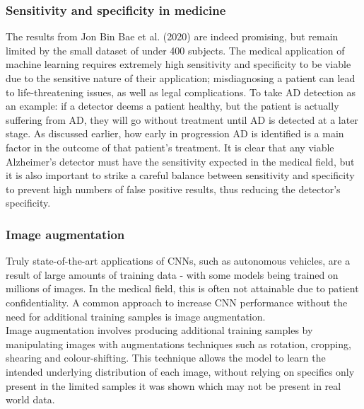 \documentclass[
    author={Kai Hulme},
    supervisor={Dr Jon Bird},
    degree={BSc},
    title={Generative Adversarial Networks as an Augmentation Technique},
    subtitle={for Alzheimer's Disease Detection in MRI Volumes},
    type={Research},
    year={2021} 
]{dissertation}
\begin{document}
\subsubsection{Sensitivity and specificity in medicine}
\label{sens_spec_in_medicine}

The results from Jon Bin Bae et al. (2020) are indeed promising, but remain limited by the small dataset of under 400 subjects. The medical application of machine learning requires extremely high sensitivity and specificity to be viable due to the sensitive nature of their application; misdiagnosing a patient can lead to life-threatening issues, as well as legal complications. To take AD detection as an example: if a detector deems a patient healthy, but the patient is actually suffering from AD, they will go without treatment until AD is detected at a later stage. As discussed earlier, how early in progression AD is identified is a main factor in the outcome of that patient's treatment. It is clear that any viable Alzheimer's detector must have the sensitivity expected in the medical field, but it is also important to strike a careful balance between sensitivity and specificity to prevent high numbers of false positive results, thus reducing the detector's specificity. 

\subsubsection{Image augmentation}

Truly state-of-the-art applications of CNNs, such as autonomous vehicles, are a result of large amounts of training data - with some models being trained on millions of images. In the medical field, this is often not attainable due to patient confidentiality. A common approach to increase CNN performance without the need for additional training samples is image augmentation.
\\

Image augmentation involves producing additional training samples by manipulating images with augmentations techniques such as rotation, cropping, shearing and colour-shifting. This technique allows the model to learn the intended underlying distribution of each image, without relying on specifics only present in the limited samples it was shown which may not be present in real world data.
\\
\end{document}
